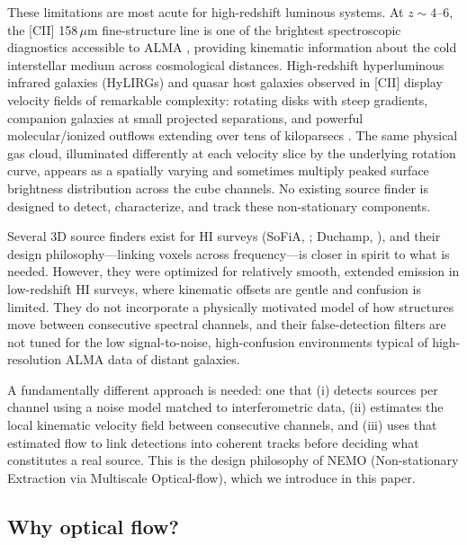 \documentclass{aa}
\begin{document}
These limitations are most acute for high-redshift luminous systems. At $z \sim 4$--6, the [CII] 158\,$\mu$m fine-structure line is one of the brightest spectroscopic diagnostics accessible to ALMA \citep{...}, providing kinematic information about the cold interstellar medium across cosmological distances. High-redshift hyperluminous infrared galaxies (HyLIRGs) and quasar host galaxies observed in [CII] display velocity fields of remarkable complexity: rotating disks with steep gradients, companion galaxies at small projected separations, and powerful molecular/ionized outflows extending over tens of kiloparsecs \citep{...}. The same physical gas cloud, illuminated differently at each velocity slice by the underlying rotation curve, appears as a spatially varying and sometimes multiply peaked surface brightness distribution across the cube channels. No existing source finder is designed to detect, characterize, and track these non-stationary components.

Several 3D source finders exist for HI surveys (SoFiA, \citealt{...}; Duchamp, \citealt{...}), and their design philosophy---linking voxels across frequency---is closer in spirit to what is needed. However, they were optimized for relatively smooth, extended emission in low-redshift HI surveys, where kinematic offsets are gentle and confusion is limited. They do not incorporate a physically motivated model of how structures move between consecutive spectral channels, and their false-detection filters are not tuned for the low signal-to-noise, high-confusion environments typical of high-resolution ALMA data of distant galaxies.

A fundamentally different approach is needed: one that (i) detects sources per channel using a noise model matched to interferometric data, (ii) estimates the local kinematic velocity field between consecutive channels, and (iii) uses that estimated flow to link detections into coherent tracks before deciding what constitutes a real source. This is the design philosophy of NEMO (Non-stationary Extraction via Multiscale Optical-flow), which we introduce in this paper.

\subsection{Why optical flow?}
\label{sec:intro_flow}
\end{document}
